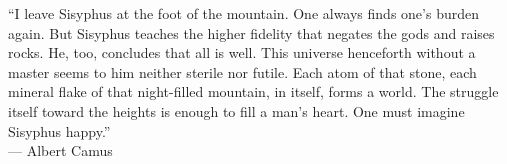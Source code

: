 \thispagestyle{empty}

\vspace*{3cm}

\begin{center}
    “I leave Sisyphus at the foot of the mountain. One always finds one's burden again. But Sisyphus teaches the higher fidelity that negates the gods and raises rocks. He, too, concludes that all is well. This universe henceforth without a master seems to him neither sterile nor futile. Each atom of that stone, each mineral flake of that night-filled mountain, in itself, forms a world. The struggle itself toward the heights is enough to fill a man's heart. One must imagine Sisyphus happy.” \\\medskip
    --- Albert Camus
\end{center}
